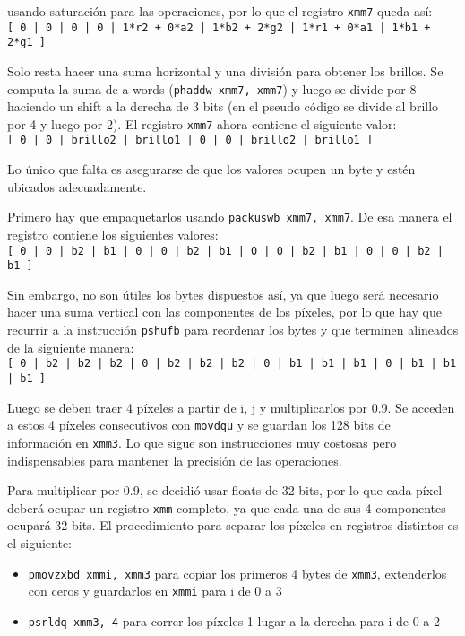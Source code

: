 usando saturación para las operaciones, por lo que el registro \texttt{xmm7} queda así: \\
\texttt{[ 0 | 0 | 0 | 0 | 1*r2 + 0*a2 | 1*b2 + 2*g2 | 1*r1 + 0*a1 | 1*b1 + 2*g1 ]} 
\par Solo resta hacer una suma horizontal y una división para obtener los brillos. Se computa la suma de a words (\texttt{phaddw xmm7, xmm7}) y luego se divide por 8 haciendo un shift a la derecha de 3 bits (en el pseudo código se divide al brillo por 4 y luego por 2). 
El registro \texttt{xmm7} ahora contiene el siguiente valor: \\
\texttt{[ 0 | 0 | brillo2 | brillo1 | 0 | 0 | brillo2 | brillo1 ]}
\par Lo único que falta es asegurarse de que los valores ocupen un byte y estén ubicados adecuadamente.
\par Primero hay que empaquetarlos usando \texttt{packuswb xmm7, xmm7}. De esa manera el registro contiene los siguientes valores: \\
\texttt{[ 0 | 0 | b2 | b1 | 0 | 0 | b2 | b1 | 0 | 0 | b2 | b1 | 0 | 0 | b2 | b1 ]}
\par Sin embargo, no son útiles los bytes dispuestos así, ya que luego será necesario hacer una suma vertical con las componentes de los píxeles, 
por lo que hay que recurrir a la instrucción \texttt{pshufb} para reordenar los bytes y que terminen alineados de la siguiente manera: \\
\texttt{[ 0 | b2 | b2 | b2 | 0 | b2 | b2 | b2 | 0 | b1 | b1 | b1 | 0 | b1 | b1 | b1 ]}
\par Luego se deben traer 4 píxeles a partir de i, j y multiplicarlos por 0.9. Se acceden a estos 4 píxeles consecutivos con \texttt{movdqu} y se guardan los 128 bits de información en \texttt{xmm3}. Lo que sigue son instrucciones muy costosas pero indispensables para mantener la precisión de las operaciones.
\par Para multiplicar por 0.9, se decidió usar floats de 32 bits, por lo que cada píxel deberá ocupar un registro \texttt{xmm} completo, ya que cada una de sus 4 componentes ocupará 32 bits. El procedimiento para separar los píxeles en registros distintos es el siguiente:
\begin{itemize}
	\item \texttt{pmovzxbd xmmi, xmm3} para copiar los primeros 4 bytes de \texttt{xmm3}, extenderlos con ceros y guardarlos en \texttt{xmmi} para i de 0 a 3
	\item \texttt{psrldq xmm3, 4} para correr los píxeles 1 lugar a la derecha para i de 0 a 2
\end{itemize}

